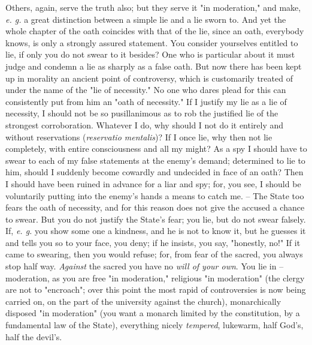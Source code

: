 Others, again, serve the truth also; but they serve it "{}in moderation,"{} 
and make, \textit{e. g.} a great distinction between a simple lie and a lie 
sworn to. And yet the whole chapter of the oath coincides with that of the 
lie, since an oath, everybody knows, is only a strongly assured statement. You 
consider yourselves entitled to lie, if only you do not swear to it besides? 
One who is particular about it must judge and condemn a lie as sharply as a 
false oath. But now there has been kept up in morality an ancient point of 
controversy, which is customarily treated of under the name of the "{}lie of 
necessity."{} No one who dares plead for this can consistently put from him an 
"{}oath of necessity."{} If I justify my lie as a lie of necessity, I should 
not be so pusillanimous as to rob the justified lie of the strongest 
corroboration. Whatever I do, why should I not do it entirely and without 
reservations (\textit{reservatio mentalis})? If I once lie, why then not lie 
completely, with entire consciousness and all my might? As a spy I should have 
to swear to each of my false statements at the enemy's demand; determined to 
lie to him, should I suddenly become cowardly and undecided in face of an 
oath? Then I should have been ruined in advance for a liar and spy; for, you 
see, I should be voluntarily putting into the enemy's hands a means to catch 
me. -- The State too fears the oath of necessity, and for this reason does not 
give the accused a chance to swear. But you do not justify the State's fear; 
you lie, but do not swear falsely. If, \textit{e. g.} you show some one a 
kindness, and he is not to know it, but he guesses it and tells you so to your 
face, you deny; if he insists, you say, "{}honestly, no!"{} If it came to 
swearing, then you would refuse; for, from fear of the sacred, you always stop 
half way. \textit{Against} the sacred you have no \textit{will of your own}. 
You lie in -- moderation, as you are free "{}in moderation,"{} religious "{}in 
moderation"{} (the clergy are not to "{}encroach"{}; over this point the most 
rapid of controversies is now being carried on, on the part of the university 
against the church), monarchically disposed "{}in moderation"{} (you want a 
monarch limited by the constitution, by a fundamental law of the State), 
everything nicely \textit{tempered}, lukewarm, half God's, half the devil's.

